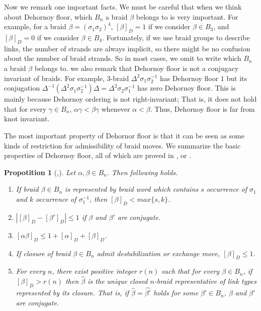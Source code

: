 \documentclass[12pt]{amsart}
\newtheorem{prop}{Propotition}
\begin{document}
   Now we remark one important facts.
   We must be careful that when we think about Dehornoy floor, which $B_{n}$ a braid $\beta$ belongs to is very important.
For example, for a braid $\beta = (\sigma_{1}\sigma_{2})^{4}$, $[\beta]_{D}=1$ if we consider $\beta \in B_{3}$, and $[\beta]_{D}=0$ if we consider $\beta \in B_{4}$. Fortunately, if we use braid groups to describe links, the number of strands are always implicit, so there might be no confusion about the number of braid strands. So in most cases, we omit to write which $B_{n}$ a braid $\beta$ belongs to. 
   we also remark that Dehornoy floor is not a conjugacy invariant of braids. For example, 3-braid $\Delta^{2}\sigma_{1}\sigma_{2}^{-1}$ has Dehornoy floor $1$ but its conjugation $\Delta^{-1}(\Delta^{2}\sigma_{1}\sigma_{2}^{-1})\Delta = \Delta^{2}\sigma_{2}\sigma_{1}^{-1}$ has zero Dehornoy floor. This is mainly because Dehornoy ordering is not right-invariant; That is, it does not hold that for every $\gamma \in B_{n}$, $\alpha\gamma < \beta\gamma$ whenever $\alpha < \beta$. Thus, Dehornoy floor is far from knot invariant.  
   
   The most important property of Dehornor floor is that it can be seen as some kinds of restriction for admissibility of braid moves. We summarize the basic properties of Dehornoy floor, all of which are proved in \cite{mn}, or \cite{ma}.

\begin{prop}[\cite{mn},\cite{ma}]
\label{prop:dehornoyfloor}
   Let $\alpha,\beta \in B_{n}$. Then following holds.
\begin{enumerate}
\item If braid $\beta \in B_{n}$ is represented by braid word which contains $s$ occurrence of $\sigma_{1}$ and $k$ occurrence of $\sigma_{1}^{-1}$, then $[\beta]_{D} < max\{s,k\}$.
\item $|[\beta]_{D}-[\beta']_{D}|\leq 1$ if $\beta$ and $\beta'$ are conjugate.
\item $[\alpha \beta]_{D} \leq 1+[\alpha]_{D}+[\beta]_{D}$.
\item If closure of braid $\beta \in B_{n}$ admit destabilization or exchange move, $[\beta]_{D} \leq 1$.
\item For every $n$, there exist positive integer $r(n)$ such that for every $\beta \in B_{n}$, if $[\beta]_{D}>r(n)$ then $\widehat{\beta}$ is the unique closed $n$-braid representative of link types represented by its closure. That is, if $\widehat{\beta} = \widehat{\beta'}$ holds for some $\beta' \in B_{n}$, $\beta$ and $\beta'$ are conjugate.
\end{enumerate}
\end{prop}
\end{document}
